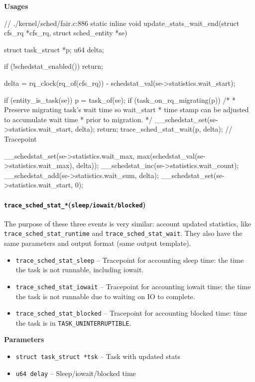 \textbf{Usages}
\begin{code}
// ./kernel/sched/fair.c:886
static inline void
update_stats_wait_end(struct cfs_rq *cfs_rq, struct sched_entity *se){
	struct task_struct *p;
	u64 delta;

	if (!schedstat_enabled())
		return;

	delta = rq_clock(rq_of(cfs_rq)) - schedstat_val(se->statistics.wait_start);

	if (entity_is_task(se)) {
		p = task_of(se);
		if (task_on_rq_migrating(p)) {
			/*
			 * Preserve migrating task's wait time so wait_start
			 * time stamp can be adjusted to accumulate wait time
			 * prior to migration.
			 */
			__schedstat_set(se->statistics.wait_start, delta);
			return;
		}
		trace_sched_stat_wait(p, delta); // Tracepoint
	}

	__schedstat_set(se->statistics.wait_max,
		      max(schedstat_val(se->statistics.wait_max), delta));
	__schedstat_inc(se->statistics.wait_count);
	__schedstat_add(se->statistics.wait_sum, delta);
	__schedstat_set(se->statistics.wait_start, 0);
}
\end{code}

\paragraph{\texttt{trace\_sched\_stat\_*}(\texttt{sleep/iowait/blocked})} 
The purpose of these three events is very similar: account updated statistics, like \texttt{trace\_sched\_stat\_runtime} and \texttt{trace\_sched\_stat\_wait}.
They also have the same parameters and output format (same output template).
\begin{itemize}
    \item \texttt{trace\_sched\_stat\_sleep} -- Tracepoint for accounting sleep time: the time the task is not runnable, including iowait.
    \item \texttt{trace\_sched\_stat\_iowait} -- Tracepoint for accounting iowait time: the time the task is not runnable due to waiting on IO to complete.
    \item \texttt{trace\_sched\_stat\_blocked} -- Tracepoint for accounting blocked time: time the task is in \verb|TASK_UNINTERRUPTIBLE|.
\end{itemize}

\textbf{Parameters}
\begin{itemize}
    \item \verb|struct task_struct *tsk| -- Task with updated stats
    \item \verb|u64 delay| -- Sleep/iowait/blocked time
\end{itemize}

